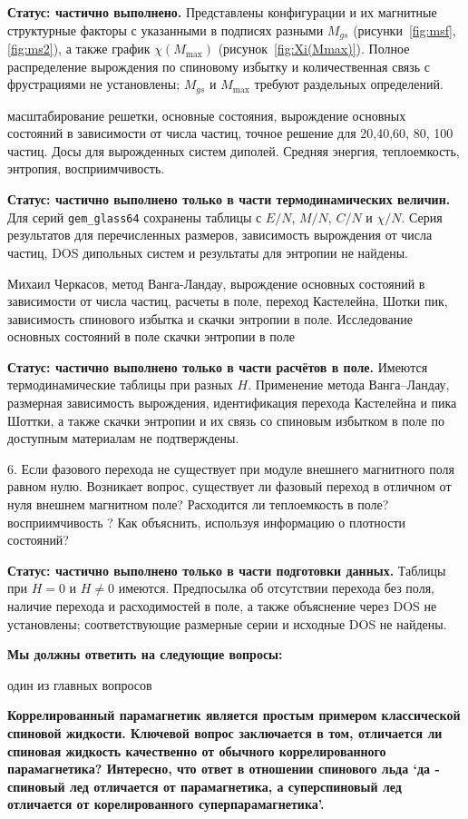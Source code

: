 \documentclass[utf8, babel, sor, jor, amsmath, amssymb, reprint]{elsarticle} %
\begin{document}
\textbf{Статус: частично выполнено.} Представлены конфигурации и их магнитные структурные факторы с указанными в подписях разными $M_{gs}$ (рисунки~\ref{fig:msf}, \ref{fig:ms2}), а также график $\chi(M_{\max})$ (рисунок~\ref{fig:Xi(Mmax)}). Полное распределение вырождения по спиновому избытку и количественная связь с фрустрациями не установлены; $M_{gs}$ и $M_{\max}$ требуют раздельных определений.

масштабирование решетки, основные состояния, вырождение основных состояний в зависимости от числа частиц, точное решение для 20,40,60, 80, 100 частиц. Досы для вырожденных систем диполей. Средняя энергия, теплоемкость, энтропия, восприимчивость.

\textbf{Статус: частично выполнено только в части термодинамических величин.} Для серий \texttt{gem\_glass64} сохранены таблицы с $E/N$, $M/N$, $C/N$ и $\chi/N$. Серия результатов для перечисленных размеров, зависимость вырождения от числа частиц, DOS дипольных систем и результаты для энтропии не найдены.

Михаил Черкасов, метод Ванга-Ландау, вырождение основных состояний в зависимости от числа частиц, расчеты в поле, переход Кастелейна, Шотки пик, зависимость спинового избытка и скачки энтропии в поле. Исследование основных состояний в поле скачки энтропии в поле

\textbf{Статус: частично выполнено только в части расчётов в поле.} Имеются термодинамические таблицы при разных $H$. Применение метода Ванга--Ландау, размерная зависимость вырождения, идентификация перехода Кастелейна и пика Шоттки, а также скачки энтропии и их связь со спиновым избытком в поле по доступным материалам не подтверждены.

6. Если фазового перехода не существует при модуле внешнего магнитного поля равном нулю. Возникает вопрос, существует ли фазовый переход в отличном от нуля внешнем магнитном поле? Расходится ли теплоемкость в поле? восприимчивость ? Как объяснить, используя информацию о плотности состояний?  

\textbf{Статус: частично выполнено только в части подготовки данных.} Таблицы при $H=0$ и $H\ne0$ имеются. Предпосылка об отсутствии перехода без поля, наличие перехода и расходимостей в поле, а также объяснение через DOS не установлены; соответствующие размерные серии и исходные DOS не найдены.


\textbf{Мы должны ответить на следующие вопросы:}

один из главных вопросов

\textbf{Коррелированный парамагнетик
	является простым примером классической спиновой жидкости. Ключевой вопрос заключается в том, отличается ли спиновая жидкость
	качественно от обычного коррелированного парамагнетика? Интересно, что ответ в отношении спинового льда ‘да - спиновый лед отличается от парамагнетика, а суперспиновый лед отличается от корелированного суперпарамагнетика’.}
\end{document}
